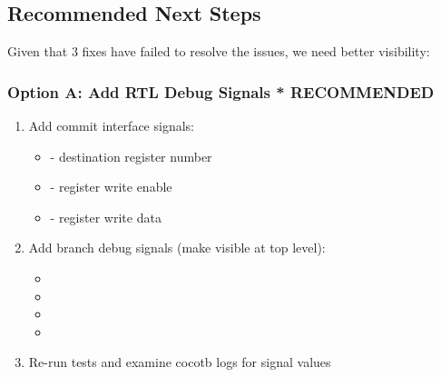 \subsection{Recommended Next Steps}\label{cr:fix:rtl-debug-report:recommended-next-steps}

\begin{record}

Given that 3 fixes have failed to resolve the issues, we need better
visibility:

\end{record}

\subsubsection{\texorpdfstring{Option A: Add RTL Debug Signals
\textbf{*} RECOMMENDED}{Option A: Add RTL Debug Signals  RECOMMENDED}}\label{cr:fix:rtl-debug-report:option-a-add-rtl-debug-signals-star-recommended}

\begin{record}

\begin{enumerate}
\def\labelenumi{\arabic{enumi}.}
\tightlist
\item
  Add commit interface signals:

  \begin{itemize}
  \tightlist
  \item
     - destination register number
  \item
     - register write enable
  \item
     - register write data
  \end{itemize}
\item
  Add branch debug signals (make visible at top level):

  \begin{itemize}
  \tightlist
  \item
  \item
  \item
  \item
  \end{itemize}
\item
  Re-run tests and examine cocotb logs for signal values
\end{enumerate}

\end{record}


